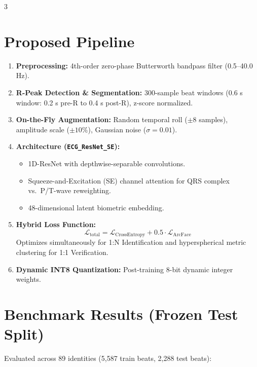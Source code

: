 \documentclass{article}
\begin{document}
\begin{multicols}{3}
\section*{\color{primary} Proposed Pipeline}
\begin{enumerate}
    \item \textbf{Preprocessing:} 4th-order zero-phase Butterworth bandpass filter (0.5--40.0 Hz).
    \item \textbf{R-Peak Detection \& Segmentation:} 300-sample beat windows (0.6 s window: 0.2 s pre-R to 0.4 s post-R), z-score normalized.
    \item \textbf{On-the-Fly Augmentation:} Random temporal roll ($\pm 8$ samples), amplitude scale ($\pm 10\%$), Gaussian noise ($\sigma=0.01$).
    \item \textbf{Architecture (\texttt{ECG\_ResNet\_SE}):}
    \begin{itemize}
        \item 1D-ResNet with depthwise-separable convolutions.
        \item Squeeze-and-Excitation (SE) channel attention for QRS complex vs.\ P/T-wave reweighting.
        \item 48-dimensional latent biometric embedding.
    \end{itemize}
    \item \textbf{Hybrid Loss Function:}
    $$\mathcal{L}_{\text{total}} = \mathcal{L}_{\text{CrossEntropy}} + 0.5 \cdot \mathcal{L}_{\text{ArcFace}}$$
    Optimizes simultaneously for 1:N Identification and hyperspherical metric clustering for 1:1 Verification.
    \item \textbf{Dynamic INT8 Quantization:} Post-training 8-bit dynamic integer weights.
\end{enumerate}

\columnbreak

\section*{\color{primary} Benchmark Results (Frozen Test Split)}
Evaluated across 89 identities (5,587 train beats, 2,288 test beats):


\end{multicols}
\end{document}

